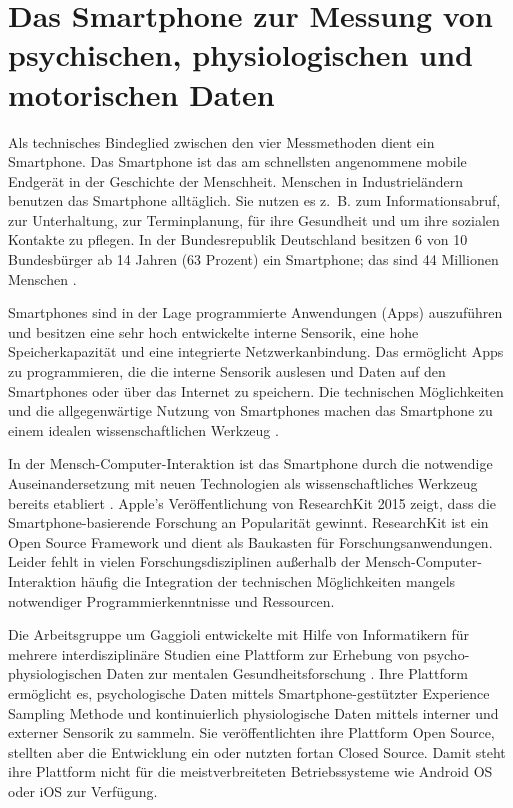 

\section{Das Smartphone zur Messung von psychischen, physiologischen und motorischen Daten} 

\label{sec:das_smartphone_zur_messung_von_psychischen_physiologischen_und_motorischen_daten}

Als technisches Bindeglied zwischen den vier Messmethoden dient ein Smartphone. Das Smartphone ist das am schnellsten angenommene mobile Endgerät in der Geschichte der Menschheit. Menschen in Industrieländern benutzen das Smartphone alltäglich. Sie nutzen es z.~B. zum Informationsabruf, zur Unterhaltung, zur Terminplanung, für ihre Gesundheit und um ihre sozialen Kontakte zu pflegen. In der Bundesrepublik Deutschland besitzen 6 von 10 Bundesbürger ab 14 Jahren (63 Prozent) ein Smartphone; das sind 44 Millionen Menschen \citep{bitkom2015}.

Smartphones sind in der Lage programmierte Anwendungen (Apps) auszuführen und besitzen eine sehr hoch entwickelte interne Sensorik, eine hohe Speicherkapazität und eine integrierte Netzwerkanbindung. Das ermöglicht Apps zu programmieren, die die interne Sensorik auslesen und Daten auf den Smartphones oder über das Internet zu speichern. Die technischen Möglichkeiten und die allgegenwärtige Nutzung von Smartphones machen das Smartphone zu einem idealen wissenschaftlichen Werkzeug \citep{Raento2009}.

In der Mensch-Computer-Interaktion ist das Smartphone durch die notwendige Auseinandersetzung mit neuen Technologien als wissenschaftliches Werkzeug bereits etabliert \citep{Froehlich2007}. Apple's Veröffentlichung von ResearchKit 2015 zeigt, dass die Smartphone-basierende Forschung an Popularität gewinnt. ResearchKit ist ein Open Source Framework und dient als Baukasten für Forschungsanwendungen. Leider fehlt in vielen Forschungsdisziplinen außerhalb der Mensch-Computer-Interaktion häufig die Integration der technischen Möglichkeiten mangels notwendiger Programmierkenntnisse und Ressourcen.

Die Arbeitsgruppe um Gaggioli entwickelte mit Hilfe von Informatikern für mehrere interdisziplinäre Studien eine Plattform zur Erhebung von psycho-physiologischen Daten zur mentalen Gesundheitsforschung \citep{Gaggioli2013}. Ihre Plattform ermöglicht es, psychologische Daten mittels Smartphone-gestützter Experience Sampling Methode und kontinuierlich physiologische Daten mittels interner und externer Sensorik zu sammeln. Sie veröffentlichten ihre Plattform Open Source, stellten aber die Entwicklung ein oder nutzten fortan Closed Source. Damit steht ihre Plattform nicht für die meistverbreiteten Betriebssysteme wie Android OS oder iOS zur Verfügung.


